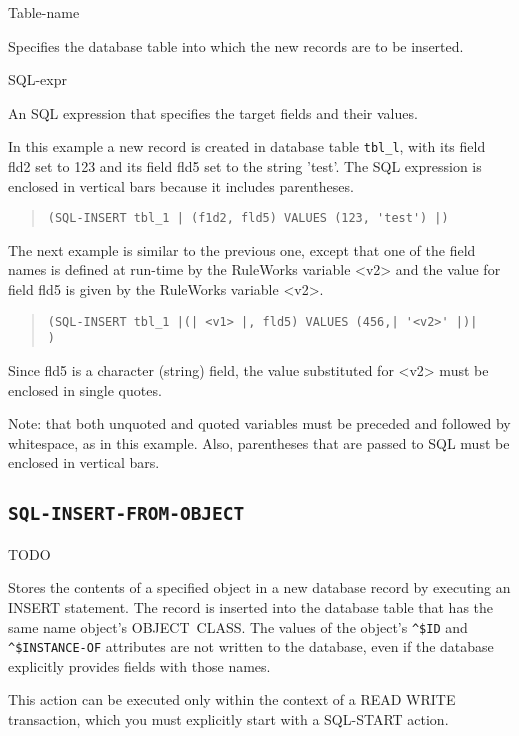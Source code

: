 {{Table-name

Specifies the database table into which the new records are
to be inserted.

SQL-expr

An SQL expression that specifies the target fields and their
values.



\Example

In this example a new record is created in database table
\verb|tbl_l|, with its field fld2 set to 123 and its field fld5 set
to the string 'test'. The SQL expression is enclosed in
vertical bars because it includes parentheses.

\begin{quote}
\begin{verbatim}
(SQL-INSERT tbl_1 | (f1d2, fld5) VALUES (123, 'test') |)
\end{verbatim}
\end{quote}

The next example is similar to the previous one, except that
one of the field names is defined at run-time by the
RuleWorks variable <v2> and the value for field fld5 is given
by the RuleWorks variable <v2>.
\begin{quote}
\begin{verbatim}
(SQL-INSERT tbl_1 |(| <v1> |, fld5) VALUES (456,| '<v2>' |)|
)
\end{verbatim}
\end{quote}

Since fld5 is a character (string) field, the value
substituted for <v2> must be enclosed in single quotes.

Note: that both unquoted and quoted variables must be
preceded and followed by whitespace, as in this example.
Also, parentheses that are passed to SQL must be enclosed in
vertical bars.

\subsection{\tt{SQL-INSERT-FROM-OBJECT}}
TODO

Stores the contents of a specified object in a new database
record by executing an INSERT statement. The record is
inserted into the database table that has the same name
object's OBJECT~CLASS. The values of the object's \verb|^$ID| and
\verb|^$INSTANCE-OF| attributes are not written to the database,
even if the database explicitly provides fields with those
names.

This action can be executed only within the context of a READ
WRITE transaction, which you must explicitly start with a
SQL-START action.



}}
